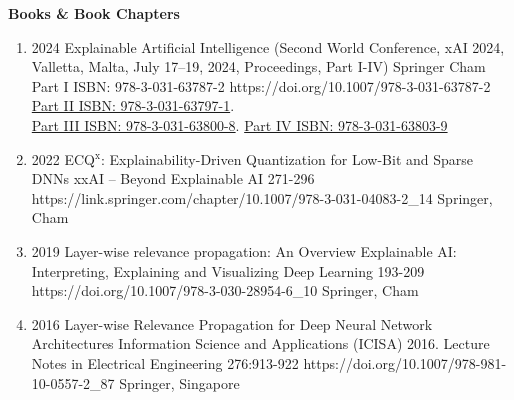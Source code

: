 \headedsection %
{\bf Books \& Book Chapters}{}
{
    \begin{enumerate}

        \item {}
                        {2024}
                        {Explainable Artificial Intelligence (Second World Conference, xAI 2024, Valletta, Malta, July 17–19, 2024, Proceedings, Part I-IV)}
                        {Springer}
                        {Cham}
                        {Part I ISBN: 978-3-031-63787-2}
                        {https://doi.org/10.1007/978-3-031-63787-2}
                        {\href{https://doi.org/10.1007/978-3-031-63797-1}{Part II ISBN: 978-3-031-63797-1}.\\
                         \href{https://doi.org/10.1007/978-3-031-63800-8}{Part III ISBN: 978-3-031-63800-8}.
                         \href{https://doi.org/10.1007/978-3-031-63803-9}{Part IV ISBN: 978-3-031-63803-9}}

        \item {}
                            {2022}
                            {ECQ$^{\textrm{x}}$: Explainability-Driven Quantization for Low-Bit and Sparse DNNs}
                            {xxAI -- Beyond Explainable AI}
                            {271-296}
                            {https://link.springer.com/chapter/10.1007/978-3-031-04083-2_14}
                            {Springer, Cham}

        \item {}
                            {2019}
                            {Layer-wise relevance propagation: An Overview}
                            {Explainable AI: Interpreting, Explaining and Visualizing Deep Learning}
                            {193-209}
                            {https://doi.org/10.1007/978-3-030-28954-6_10}
                            {Springer, Cham}

        \item {}
                            {2016}
                            {Layer-wise Relevance Propagation for Deep Neural Network Architectures}
                            {Information Science and Applications (ICISA) 2016. Lecture Notes in Electrical Engineering}
                            {276:913-922}
                            {https://doi.org/10.1007/978-981-10-0557-2_87}
                            {Springer, Singapore}


\end{enumerate}}
